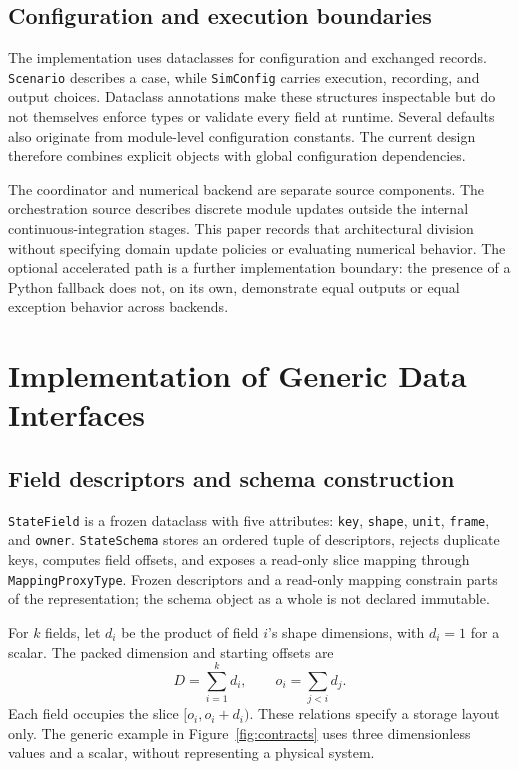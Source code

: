 \documentclass[11pt,a4paper]{article}
\newcommand{\code}[1]{\texttt{#1}}
\begin{document}
\subsection{Configuration and execution boundaries}
The implementation uses dataclasses for configuration and exchanged records. \code{Scenario} describes a case, while \code{SimConfig} carries execution, recording, and output choices. Dataclass annotations make these structures inspectable but do not themselves enforce types or validate every field at runtime. Several defaults also originate from module-level configuration constants. The current design therefore combines explicit objects with global configuration dependencies.

The coordinator and numerical backend are separate source components. The orchestration source describes discrete module updates outside the internal continuous-integration stages. This paper records that architectural division without specifying domain update policies or evaluating numerical behavior. The optional accelerated path is a further implementation boundary: the presence of a Python fallback does not, on its own, demonstrate equal outputs or equal exception behavior across backends.

\section{Implementation of Generic Data Interfaces}
\label{sec:implementation}
\subsection{Field descriptors and schema construction}
\code{StateField} is a frozen dataclass with five attributes: \code{key}, \code{shape}, \code{unit}, \code{frame}, and \code{owner}. \code{StateSchema} stores an ordered tuple of descriptors, rejects duplicate keys, computes field offsets, and exposes a read-only slice mapping through \code{MappingProxyType}. Frozen descriptors and a read-only mapping constrain parts of the representation; the schema object as a whole is not declared immutable.

For $k$ fields, let $d_i$ be the product of field $i$'s shape dimensions, with $d_i=1$ for a scalar. The packed dimension and starting offsets are
\begin{equation}
D=\sum_{i=1}^{k} d_i, \qquad o_i=\sum_{j<i} d_j.
\end{equation}
Each field occupies the slice $[o_i,o_i+d_i)$. These relations specify a storage layout only. The generic example in Figure~\ref{fig:contracts} uses three dimensionless values and a scalar, without representing a physical system.
\end{document}
